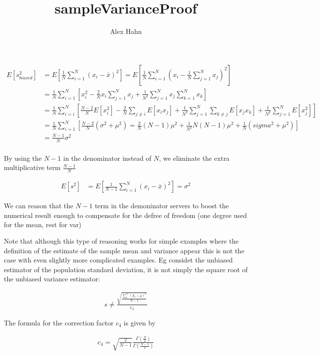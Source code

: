 \documentclass{article}
\title{sampleVarianceProof}
\author{Alex Hahn}
\begin{document}
\maketitle

\begin{align}
E[s^2_{biased}] &= E\left[\frac{1}{N}\sum^N_{i=1}(x_i-\bar{x})^2\right]=E\left[\frac{1}{N}\sum^N_{i=1}\left(x_i - \frac{1}{N}\sum^N_{j=1}x_j\right)^2\right] \nonumber\\
&= \frac{1}{N}\sum^N_{i=1}\left[x_i^2 - \frac{2}{N}x_i\sum^N_{j=1}x_j + \frac{1}{N^2}\sum^N_{j=1}x_j\sum^N_{k=1}x_k\right] \nonumber\\
&= \frac{1}{N}\sum^N_{i=i}\left[\frac{N-2}{N}E[x^2_i]-\frac{2}{N}\sum_{j\not=i}E[x_ix_j] + \frac{1}{N^2}\sum^N_{j=1}\sum_{k\not=j}E[x_jx_k] + \frac{1}{N^2}\sum^N_{j=1}E[x_j^2]\right] \nonumber\\
&= \frac{1}{N}\sum^N_{i=1}\left[\frac{N-2}{N}(\sigma^2+\mu^2)=\frac{2}{N}(N-1)\mu^2 + \frac{1}{N^2}N(N-1)\mu^2 + \frac{1}{N}(sigma^2+\mu^2)\right] \nonumber\\
&= \frac{N-1}{N}\sigma^2 \nonumber\\
\end{align}

By using the $N-1$ in the denominator instead of $N$, we eliminate the extra multiplicative term $\frac{N-1}{N}$

\begin{align}
  E[s^2] &= E\left[\frac{1}{N-1}\sum^N_{i=1}(x_i-\bar{x})^2\right]=\sigma^2
\end{align}

We can reason that the $N-1$ term in the demoninator servers to boost the numerical result enough to compensate for the defree of freedom (one degree used for the mean, rest for var)

Note that although this type of reasoning works for simple examples where the definition of the estimate of the sample mean and variance appear this is not the case with even slightly more
complicated examples. Eg considet the unbiased estimator of the population standard deviation, it is not simply the square root of the unbiased variance estimator:


\begin{align}
  s\not=\frac{\sqrt{\frac{\sum^N_i(X_i-\mu)^2}{N-1}}}{c_4}
\end{align}


The formula for the correction factor $c_4$ is given by

\begin{align}
  c_4=\sqrt{\frac{2}{N-1}}\frac{\Gamma(\frac{N}{2})}{\Gamma(\frac{N-1}{2})}
\end{align}
\end{document}
